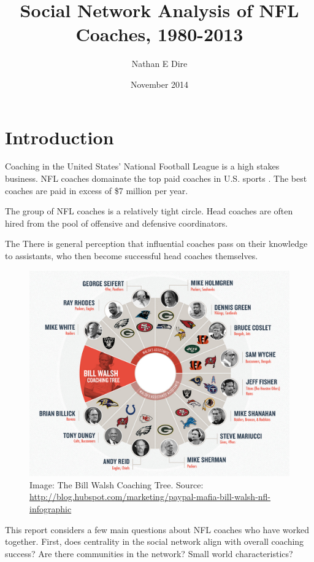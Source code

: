 \documentclass[11pt]{article}\usepackage[]{graphicx}\usepackage[]{color}
\begin{document}
\title{Social Network Analysis of NFL Coaches, 1980-2013}
\author{Nathan E Dire}
\date{November 2014}
\maketitle

\section{Introduction}

Coaching in the United States' National Football League is a high stakes
business.  NFL coaches domainate the top paid coaches in U.S. sports
\cite{forbes-pay}.  The best coaches are paid in excess of \$7 million per year.

The group of NFL coaches is a relatively tight circle.  Head coaches are often
hired from the pool of offensive and defensive coordinators.  

The There is general perception that influential coaches pass on their knowledge to
assistants, who then become successful head coaches themselves.
\begin{figure}
\begin{center}
\includegraphics[width=\textwidth]{walsh_network.png}
\end{center}
\caption{Image: The Bill Walsh Coaching Tree. Source:
\url{http://blog.hubspot.com/marketing/paypal-mafia-bill-walsh-nfl-infographic}}
\label{fig-bill-walsh}
\end{figure}

This report considers a few main questions about NFL coaches who have worked
together.  First, does centrality in the social network align with overall
coaching success?  Are there communities in the network?  Small world
characteristics?
\end{document}
